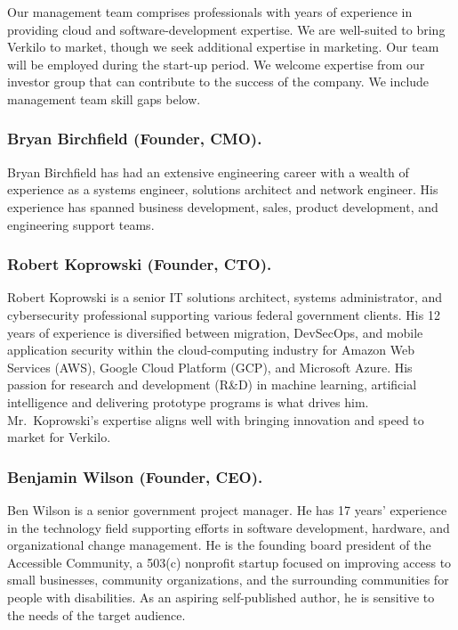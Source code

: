 \documentclass[10pt,openany]{book}
\begin{document}
Our management team comprises professionals with years of experience in
providing cloud and software-development expertise. We are well-suited
to bring Verkilo to market, though we seek additional expertise in
marketing. Our team will be employed during the start-up period. We
welcome expertise from our investor group that can contribute to the
success of the company. We include management team skill gaps below.

\hypertarget{bryan-birchfield-founder-cmo.}{%
\subsubsection{Bryan Birchfield (Founder,
CMO).}\label{bryan-birchfield-founder-cmo.}}

Bryan Birchfield has had an extensive engineering career with a wealth
of experience as a systems engineer, solutions architect and network
engineer. His experience has spanned business development, sales,
product development, and engineering support teams.

\hypertarget{robert-koprowski-founder-cto.}{%
\subsubsection{Robert Koprowski (Founder,
CTO).}\label{robert-koprowski-founder-cto.}}

Robert Koprowski is a senior IT solutions architect, systems
administrator, and cybersecurity professional supporting various federal
government clients. His 12 years of experience is diversified between
migration, DevSecOps, and mobile application security within the
cloud-computing industry for Amazon Web Services (AWS), Google Cloud
Platform (GCP), and Microsoft Azure. His passion for research and
development (R\&D) in machine learning, artificial intelligence and
delivering prototype programs is what drives him. Mr.~Koprowski's
expertise aligns well with bringing innovation and speed to market for
Verkilo.

\newpage

\hypertarget{benjamin-wilson-founder-ceo.}{%
\subsubsection{Benjamin Wilson (Founder,
CEO).}\label{benjamin-wilson-founder-ceo.}}

Ben Wilson is a senior government project manager. He has 17 years'
experience in the technology field supporting efforts in software
development, hardware, and organizational change management. He is the
founding board president of the Accessible Community, a 503(c) nonprofit
startup focused on improving access to small businesses, community
organizations, and the surrounding communities for people with
disabilities. As an aspiring self-published author, he is sensitive to
the needs of the target audience.
\end{document}
